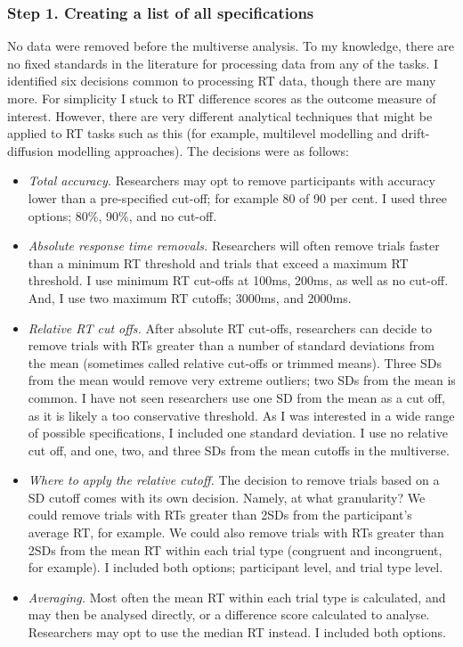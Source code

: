 \documentclass[
  man,floatsintext]{apa6}
\begin{document}
\hypertarget{step-1.-creating-a-list-of-all-specifications}{%
\subsubsection{Step 1. Creating a list of all specifications}\label{step-1.-creating-a-list-of-all-specifications}}

No data were removed before the multiverse analysis. To my knowledge, there are no fixed standards in the literature for processing data from any of the tasks. I identified six decisions common to processing RT data, though there are many more. For simplicity I stuck to RT difference scores as the outcome measure of interest. However, there are very different analytical techniques that might be applied to RT tasks such as this (for example, multilevel modelling and drift-diffusion modelling approaches). The decisions were as follows:

\begin{itemize}
\item
  \emph{Total accuracy.} Researchers may opt to remove participants with accuracy lower than a pre-specified cut-off; for example 80 of 90 per cent. I used three options; 80\%, 90\%, and no cut-off.
\item
  \emph{Absolute response time removals.} Researchers will often remove trials faster than a minimum RT threshold and trials that exceed a maximum RT threshold. I use minimum RT cut-offs at 100ms, 200ms, as well as no cut-off. And, I use two maximum RT cutoffs; 3000ms, and 2000ms.
\item
  \emph{Relative RT cut offs.} After absolute RT cut-offs, researchers can decide to remove trials with RTs greater than a number of standard deviations from the mean (sometimes called relative cut-offs or trimmed means). Three SDs from the mean would remove very extreme outliers; two SDs from the mean is common. I have not seen researchers use one SD from the mean as a cut off, as it is likely a too conservative threshold. As I was interested in a wide range of possible specifications, I included one standard deviation. I use no relative cut off, and one, two, and three SDs from the mean cutoffs in the multiverse.
\item
  \emph{Where to apply the relative cutoff.} The decision to remove trials based on a SD cutoff comes with its own decision. Namely, at what granularity? We could remove trials with RTs greater than 2SDs from the participant's average RT, for example. We could also remove trials with RTs greater than 2SDs from the mean RT within each trial type (congruent and incongruent, for example). I included both options; participant level, and trial type level.
\item
  \emph{Averaging.} Most often the mean RT within each trial type is calculated, and may then be analysed directly, or a difference score calculated to analyse. Researchers may opt to use the median RT instead. I included both options.
\end{itemize}
\end{document}
